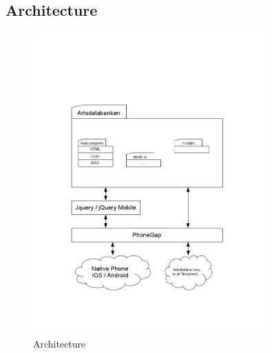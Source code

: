 \subsection{Architecture}

\begin{figure}[htb]
	\centering
	\includegraphics[width=0.8\textwidth]{implementation/architecture/architecture.png}
	\caption{Architecture}
	\label{fig:architecture}
\end{figure}
